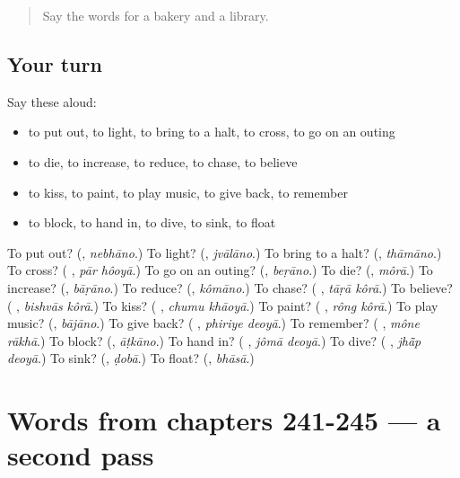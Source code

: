 \begin{quote}
Say the words for a bakery and a library.
\end{quote}

\subsection*{Your turn}
Say these aloud:

\begin{itemize}
\raggedright
  \item to put out, to light, to bring to a halt, to cross, to go on an outing
  \item to die, to increase, to reduce, to chase, to believe
  \item to kiss, to paint, to play music, to give back, to remember
  \item to block, to hand in, to dive, to sink, to float
\end{itemize}

\begin{tcolorbox}[breakable,colback=teal!4,colframe=teal!35!black,title={Before you move on}]
To put out? (\textbf{}, \emph{nebhāno}.) To light? (\textbf{}, \emph{jvālāno}.) To bring to a halt? (\textbf{}, \emph{thāmāno}.) To cross? (\textbf{ }, \emph{pār hôoyā}.) To go on an outing? (\textbf{}, \emph{beṛāno}.) To die? (\textbf{}, \emph{môrā}.) To increase? (\textbf{}, \emph{bāṛāno}.) To reduce? (\textbf{}, \emph{kômāno}.) To chase? (\textbf{ }, \emph{tāṛā kôrā}.) To believe? (\textbf{ }, \emph{bishvās kôrā}.) To kiss? (\textbf{ }, \emph{chumu khāoyā}.) To paint? (\textbf{ }, \emph{rông kôrā}.) To play music? (\textbf{}, \emph{bājāno}.) To give back? (\textbf{ }, \emph{phiriye deoyā}.) To remember? (\textbf{ }, \emph{mône rākhā}.) To block? (\textbf{}, \emph{āṭkāno}.) To hand in? (\textbf{ }, \emph{jômā deoyā}.) To dive? (\textbf{ }, \emph{jhā̃p deoyā}.) To sink? (\textbf{}, \emph{ḍobā}.) To float? (\textbf{}, \emph{bhāsā}.)
\end{tcolorbox}
\section[(dialogue)]{Words from chapters 241-245 — a second pass}

